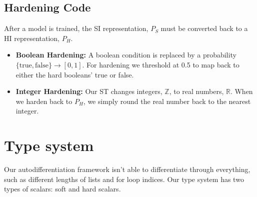 \documentclass{article}
\begin{document}

\subsection{Hardening Code}
After a model is trained, the SI representation, $P_S$ must be converted back to a HI representation, $P_H$.
\begin{itemize}
    \item \textbf{Boolean Hardening:} A boolean condition is replaced by a probability $\{\text{true}, \text{false} \} \longrightarrow [0, 1]$. For hardening we threshold at 0.5 to map back to either the hard booleans' true or false.
    \item \textbf{Integer Hardening:} Our ST changes integers, $\mathbb{Z}$, to real numbers, $\mathbb{R}$. When we harden back to $P_H$, we simply round the real number back to the nearest integer.
\end{itemize}

\section{Type system}
Our autodifferentiation framework isn't able to differentiate through everything, such as different lengths of lists and for loop indices. Our type system has two types of scalars: soft and hard scalars.
\end{document}

